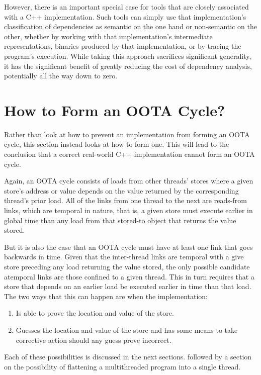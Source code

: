 \documentclass[10]{article}
\begin{document}
However, there is an important special case for tools that are closely
associated with a C++ implementation.
Such tools can simply use that implementation's classification of
dependencies as semantic on the one hand or non-semantic on the other,
whether by working with that implementation's intermediate representations,
binaries produced by that implementation, or by tracing the program's
execution.
While taking this approach sacrifices significant generality, it has the
significant benefit of greatly reducing the cost of dependency analysis,
potentially all the way down to zero.

\section{How to Form an OOTA Cycle?}
\label{sec:How to Form an OOTA Cycle?}

Rather than look at how to prevent an implementation from forming
an OOTA cycle, this section instead looks at how to form one.
This will lead to the conclusion that a correct real-world C++
implementation cannot form an OOTA cycle.

Again, an OOTA cycle consists of loads from other threads' stores where
a given store's address or value depends on the value returned by
the corresponding thread's prior load.
All of the links from one thread to the next are reads-from links, which
are temporal in nature, that is, a given store must execute earlier in
global time than any load from that stored-to object that returns the
value stored.

But it is also the case that an OOTA cycle must have at least one link
that goes backwards in time.
Given that the inter-thread links are temporal with a give store preceding
any load returning the value stored, the only possible candidate atemporal
links are those confined to a given thread.
This in turn requires that a store that depends on an earlier load
be executed earlier in time than that load.
The two ways that this can happen are when the implementation:

\begin{enumerate}
\item	Is able to prove the location and value of the store.
\item	Guesses the location and value of the store and has some means
	to take corrective action should any guess prove incorrect.
\end{enumerate}

Each of these possibilities is discussed in the next sections.
followed by a section on the possibility of flattening a multithreaded
program into a single thread.
\end{document}
